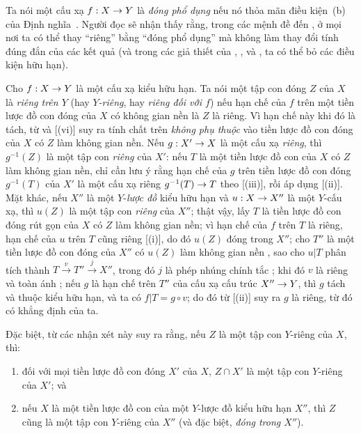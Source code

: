 \documentclass[oneside,10pt]{amsart}
\makeatletter
\newcommand{\ega@arrow}[2]{\mathchoice{#1}{#2}{#2}{#2}}
\renewcommand{\to}{\ega@arrow{\longrightarrow}{\rightarrow}}
\newcommand{\oldpage}[2][]{\marginnote{\normalfont\footnotesize\textbf{#1}~|~#2}\ignorespaces}
\let\EGAOriginalLabel\label
\renewcommand{\label}[1]{\phantomsection\EGAOriginalLabel{#1}}
\makeatother
\begin{document}
\begin{remark}[5.4.9]
\label{II.5.4.9}
Ta nói một cấu xạ $f:X\to Y$ là \emph{đóng phổ dụng} nếu nó thỏa mãn điều kiện~(b) của Định nghĩa~.
Người đọc sẽ nhận thấy rằng,
\oldpage[II]{103}
trong các mệnh đề  đến , ở mọi nơi ta có thể thay ``riêng'' bằng ``đóng phổ dụng'' mà không làm thay đổi tính đúng đắn của các kết quả (và trong các giả thiết của , ,  và , ta có thể bỏ các điều kiện hữu hạn).
\end{remark}

\begin{env}[5.4.10]
\label{II.5.4.10}
Cho $f:X\to Y$ là một cấu xạ kiểu hữu hạn.
Ta nói một tập con đóng $Z$ của $X$ là \emph{riêng trên $Y$} (hay \emph{$Y$-riêng}, hay \emph{riêng đối với $f$}) nếu hạn chế của $f$ trên một tiền lược đồ con đóng của $X$ có không gian nền là $Z$  là riêng.
Vì hạn chế này khi đó là tách, từ  và [(vi)] suy ra tính chất trên \emph{không phụ thuộc} vào tiền lược đồ con đóng của $X$ có $Z$ làm không gian nền.
Nếu $g:X'\to X$ là một cấu xạ \emph{riêng}, thì $g^{-1}(Z)$ là một tập con \emph{riêng} của $X'$:
nếu $T$ là một tiền lược đồ con của $X$ có $Z$ làm không gian nền, chỉ cần lưu ý rằng hạn chế của $g$ trên tiền lược đồ con đóng $g^{-1}(T)$ của $X'$ là một cấu xạ riêng $g^{-1}(T)\to T$ theo [(iii)], rồi áp dụng [(ii)].
Mặt khác, nếu $X''$ là một $Y$-\emph{lược đồ} kiểu hữu hạn và $u:X\to X''$ là một $Y$-cấu xạ, thì $u(Z)$ là một tập con \emph{riêng} của $X''$;
thật vậy, lấy $T$ là tiền lược đồ con đóng rút gọn của $X$ có $Z$ làm không gian nền;
vì hạn chế của $f$ trên $T$ là riêng, hạn chế của $u$ trên $T$ cũng riêng [(i)], do đó $u(Z)$ đóng trong $X''$;
cho $T''$ là một tiền lược đồ con đóng của $X''$ có $u(Z)$ làm không gian nền , sao cho $u|T$ phân tích thành $T\xrightarrow{v}T''\xrightarrow{j}X''$, trong đó $j$ là phép nhúng chính tắc ; khi đó $v$ là riêng và toàn ánh ;
nếu $g$ là hạn chế trên $T''$ của cấu xạ cấu trúc $X''\to Y$, thì $g$ tách và thuộc kiểu hữu hạn, và ta có $f|T=g\circ v$;
do đó từ [(ii)] suy ra $g$ là riêng, từ đó có khẳng định của ta.
\end{env}

Đặc biệt, từ các nhận xét này suy ra rằng, nếu $Z$ là một tập con $Y$-riêng của $X$, thì:
\begin{enumerate}
  \item đối với mọi tiền lược đồ con đóng $X'$ của $X$, $Z\cap X'$ là một tập con $Y$-riêng của $X'$; và
  \item nếu $X$ là một tiền lược đồ con của một $Y$-lược đồ kiểu hữu hạn $X''$, thì $Z$ cũng là một tập con $Y$-riêng của $X''$ (và đặc biệt, \emph{đóng trong $X''$}).
\end{enumerate}
\end{document}

